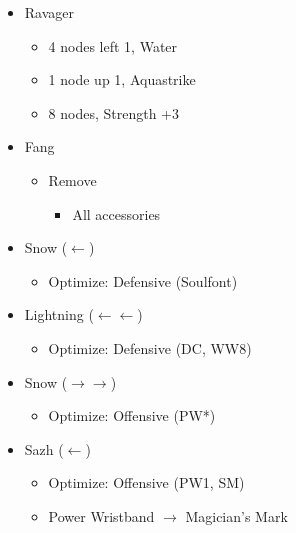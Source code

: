 \begin{multicols}{2}
\begin{menu}
\begin{itemize}
\begin{itemize}
\begin{itemize}
\begin{itemize}
            \end{itemize}
            \item Ravager
            \begin{itemize}
                \item 4 nodes left 1, Water
                \item 1 node up 1, Aquastrike
                \item 8 nodes, Strength +3
            \end{itemize}
        \end{itemize}
    \end{itemize}
    \equip
    \begin{itemize}
        \item Fang 
        \begin{itemize}
            \item Remove
            \begin{itemize}
                \item All accessories
            \end{itemize}
        \end{itemize}
        \item Snow ($\leftarrow$)
        \begin{itemize}
                \item Optimize: Defensive (Soulfont)
        \end{itemize}
        \item Lightning ($\leftarrow\leftarrow$)
        \begin{itemize}
                \item Optimize: Defensive (DC, WW8)
        \end{itemize}
        \item Snow ($\rightarrow\rightarrow$)
        \begin{itemize}
                \item Optimize: Offensive (PW*)
        \end{itemize}
        \item Sazh ($\leftarrow$)
        \begin{itemize}
                \item Optimize: Offensive (PW1, SM)
                \item Power Wristband $\rightarrow$ Magician's Mark
        \end{itemize}
    \end{itemize}
\end{itemize}
\end{menu}


\end{multicols}
